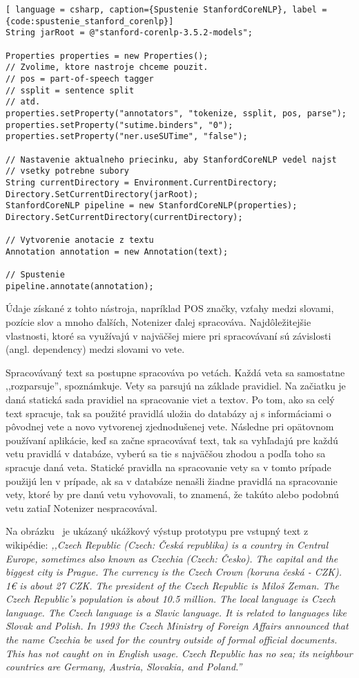 \begin{lstlisting}[ language = csharp, caption={Spustenie StanfordCoreNLP}, label = {code:spustenie_stanford_corenlp}]
String jarRoot = @"stanford-corenlp-3.5.2-models";

Properties properties = new Properties();
// Zvolime, ktore nastroje chceme pouzit.
// pos = part-of-speech tagger
// ssplit = sentence split
// atd.
properties.setProperty("annotators", "tokenize, ssplit, pos, parse");
properties.setProperty("sutime.binders", "0");
properties.setProperty("ner.useSUTime", "false");

// Nastavenie aktualneho priecinku, aby StanfordCoreNLP vedel najst
// vsetky potrebne subory
String currentDirectory = Environment.CurrentDirectory;
Directory.SetCurrentDirectory(jarRoot);
StanfordCoreNLP pipeline = new StanfordCoreNLP(properties);
Directory.SetCurrentDirectory(currentDirectory);

// Vytvorenie anotacie z textu
Annotation annotation = new Annotation(text);

// Spustenie
pipeline.annotate(annotation);
\end{lstlisting}

Údaje získané z tohto nástroja, napríklad POS značky, vzťahy medzi slovami, pozície slov a mnoho ďalších, Notenizer ďalej spracováva. Najdôležitejšie vlastnosti, ktoré sa využívajú v najväčšej miere pri spracovávaní sú závislosti (angl. dependency) medzi slovami vo vete.  

Spracovávaný text sa postupne spracováva po vetách. Každá veta sa samostatne ,,rozparsuje'', spoznámkuje. Vety sa parsujú na základe pravidiel. Na začiatku je daná statická sada pravidiel na spracovanie viet a textov. Po tom, ako sa celý text spracuje, tak sa použité pravidlá uložia do databázy aj s informáciami o pôvodnej vete a novo vytvorenej zjednodušenej vete. Následne pri opätovnom používaní aplikácie, keď sa začne spracovávať text, tak sa vyhľadajú pre každú vetu pravidlá v databáze, vyberú sa tie s najväčšou zhodou a podľa toho sa spracuje daná veta. Statické pravidla na spracovanie vety sa v tomto prípade použijú len v prípade, ak sa v databáze nenašli žiadne pravidlá na spracovanie vety, ktoré by pre danú vetu vyhovovali, to znamená, že takúto alebo podobnú vetu zatiaľ Notenizer nespracovával.

Na obrázku~ je ukázaný ukážkový výstup prototypu pre vstupný text z wikipédie:
\textit{,,Czech Republic (Czech: Česká republika) is a country in Central Europe, sometimes also known as Czechia (Czech: Česko). The capital and the biggest city is Prague. The currency is the Czech Crown (koruna česká - CZK). 1€ is about 27 CZK. The president of the Czech Republic is Miloš Zeman. The Czech Republic's population is about 10.5 million. The local language is Czech language. The Czech language is a Slavic language. It is related to languages like Slovak and Polish. In 1993 the Czech Ministry of Foreign Affairs announced that the name Czechia be used for the country outside of formal official documents. This has not caught on in English usage. Czech Republic has no sea; its neighbour countries are Germany, Austria, Slovakia, and Poland.''}
\\

